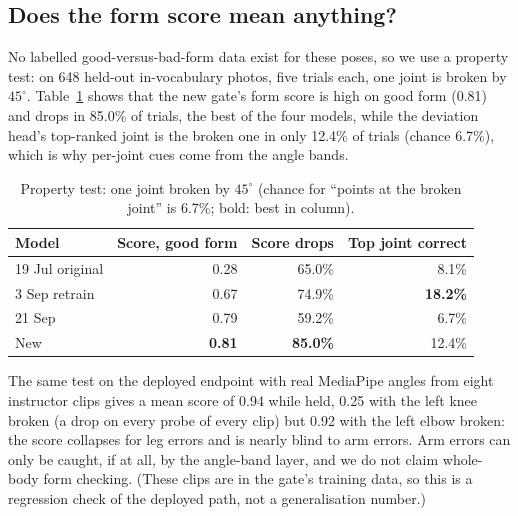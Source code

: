 \subsection{Does the form score mean anything?}
No labelled good-versus-bad-form data exist for these poses, so we use a property test: on 648 held-out in-vocabulary photos, five trials each, one joint is broken by $45^\circ$. Table~\ref{tab:form} shows that the new gate's form score is high on good form (0.81) and drops in 85.0\% of trials, the best of the four models, while the deviation head's top-ranked joint is the broken one in only 12.4\% of trials (chance 6.7\%), which is why per-joint cues come from the angle bands.
\begin{table}[t]
\centering\footnotesize
\caption{Property test: one joint broken by $45^\circ$ (chance for ``points at the broken joint'' is 6.7\%; bold: best in column).}\label{tab:form}
\begin{tabular}{@{}lrrr@{}}
\toprule
Model & Score, good form & Score drops & Top joint correct \\ \midrule
19 Jul original & 0.28 & 65.0\% & 8.1\% \\
3 Sep retrain & 0.67 & 74.9\% & \textbf{18.2\%} \\
21 Sep \vfour{} & 0.79 & 59.2\% & 6.7\% \\
New & \textbf{0.81} & \textbf{85.0\%} & 12.4\% \\ \bottomrule
\end{tabular}
\end{table}
The same test on the deployed endpoint with real MediaPipe angles from eight instructor clips gives a mean score of 0.94 while held, 0.25 with the left knee broken (a drop on every probe of every clip) but 0.92 with the left elbow broken: the score collapses for leg errors and is nearly blind to arm errors. Arm errors can only be caught, if at all, by the angle-band layer, and we do not claim whole-body form checking. (These clips are in the gate's training data, so this is a regression check of the deployed path, not a generalisation number.)

